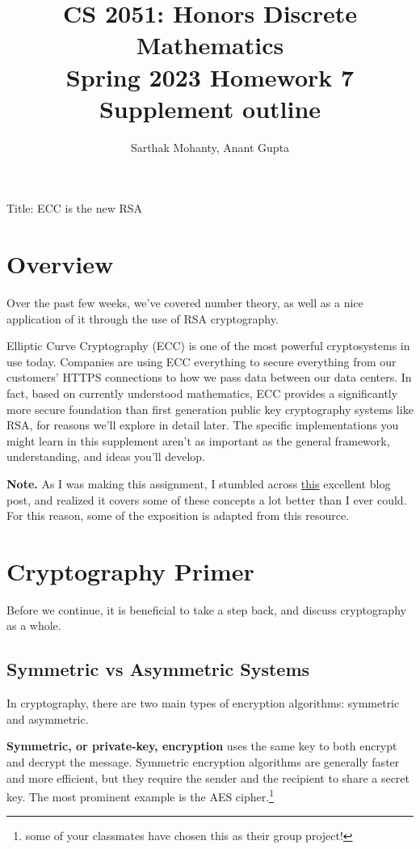 \documentclass{article}
\title{\vspace{-1cm}CS 2051: Honors Discrete Mathematics \\Spring 2023 Homework 7 Supplement outline}
\author{Sarthak Mohanty, \tiny{Anant Gupta} }
\date{}
\begin{document}
\maketitle

Title: ECC is the new RSA
\section*{Overview}

Over the past few weeks, we've covered number theory, as well as a nice application of it through the use of RSA cryptography.

\vspace{2mm}
Elliptic Curve Cryptography (ECC) is one of the most powerful cryptosystems in use today. Companies are using ECC everything to secure everything from our customers' HTTPS connections to how we pass data between our data centers. In fact, based on currently understood mathematics, ECC provides a significantly more secure foundation than first generation public key cryptography systems like RSA, for reasons we'll explore in detail later. The specific implementations you might learn in this supplement aren't as important as the general framework, understanding, and ideas you'll develop.

\vspace{2mm}
\textbf{Note.} As I was making this assignment, I stumbled across \href{https://andrea.corbellini.name/2015/05/17/elliptic-curve-cryptography-a-gentle-introduction/}{this} excellent blog post, and realized it covers some of these concepts a lot better than I ever could. For this reason, some of the exposition is adapted from this resource.


\section*{Cryptography Primer}
    Before we continue, it is beneficial to take a step back, and discuss cryptography as a whole.

\subsection*{Symmetric vs Asymmetric Systems}

    In cryptography, there are two main types of encryption algorithms: symmetric and asymmetric. 

    \vspace{3mm}
    \textbf{Symmetric, or private-key, encryption} uses the same key to both encrypt and decrypt the message. Symmetric encryption algorithms are generally faster and more efficient, but they require the sender and the recipient to share a secret key. The most prominent example is the AES cipher.\footnote{some of your classmates have chosen this as their group project!} 
\end{document}
